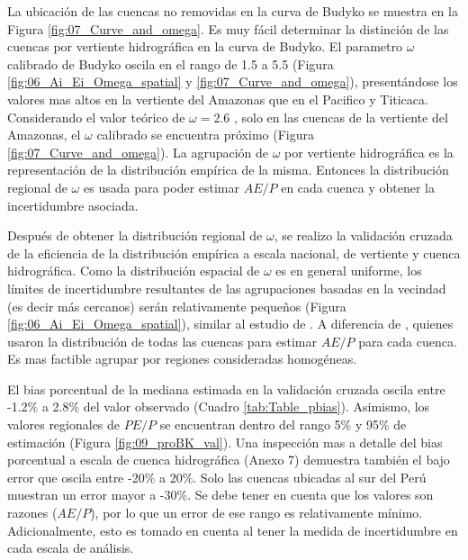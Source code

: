 \documentclass[12pt]{article}
\begin{document}


La ubicación de las cuencas no removidas en la curva de Budyko se muestra en la Figura \ref{fig:07_Curve_and_omega}. Es muy fácil determinar la distinción de las cuencas por vertiente hidrográfica en la curva de Budyko. El parametro $\omega$ calibrado de Budyko oscila en el rango de 1.5 a 5.5 (Figura \ref{fig:06_Ai_Ei_Omega_spatial} y \ref{fig:07_Curve_and_omega}), presentándose los valores mas altos en la vertiente del Amazonas que en el Pacifico y Titicaca. Considerando el valor teórico de $\omega = 2.6$ \citep{Fu1981}, solo en las cuencas de la vertiente del Amazonas, el $\omega$ calibrado se encuentra próximo (Figura \ref{fig:07_Curve_and_omega}). La agrupación de $\omega$ por vertiente hidrográfica es la representación de la distribución empírica de la misma. Entonces la distribución regional de $\omega$ es usada para poder estimar $AE/P$ en cada cuenca y obtener la incertidumbre asociada.

Después de obtener la distribución regional de $\omega$, se realizo la validación cruzada de la eficiencia de la distribución empírica a escala nacional, de vertiente y cuenca hidrográfica. Como la distribución espacial de $\omega$ es en general uniforme, los límites de incertidumbre resultantes de las agrupaciones basadas en la vecindad (es decir más cercanos) serán relativamente pequeños (Figura \ref{fig:06_Ai_Ei_Omega_spatial}), similar al estudio de \citet{Singh2015}. A diferencia de \citet{Greve2015}, quienes usaron la distribución de todas las cuencas para estimar $AE/P$ para cada cuenca. Es mas factible agrupar por regiones consideradas homogéneas.



El bias porcentual de la mediana estimada en la validación cruzada oscila entre -1.2\% a 2.8\% del valor observado (Cuadro \ref{tab:Table_pbias}). Asimismo, los valores regionales de $PE/P$ se encuentran dentro del rango 5\% y 95\% de estimación (Figura \ref{fig:09_proBK_val}). Una inspección mas a detalle del bias porcentual a escala de cuenca hidrográfica (Anexo 7) demuestra también el bajo error que oscila entre -20\% a 20\%. Solo las cuencas ubicadas al sur del Perú muestran un error mayor a -30\%. Se debe tener en cuenta que los valores son razones ($AE/P$), por lo que un error de ese rango es relativamente mínimo. Adicionalmente, esto es tomado en cuenta al tener la medida de incertidumbre en cada escala de análisis.


\end{document}
